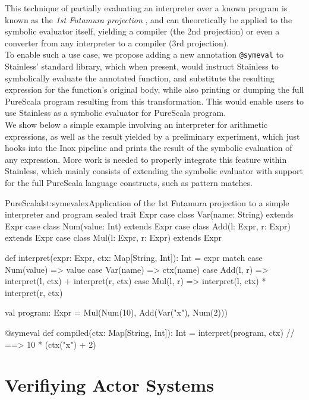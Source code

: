 \documentclass[a4paper,twoside]{article}
\newcommand{\stt}[1]{\texttt{\small{#1}}}
\begin{document}
This technique of partially evaluating an interpreter over a known program is known as the \textit{1st Futamura projection} \cite{futamura}, and can theoretically be applied to the symbolic evaluator itself, yielding a compiler (the 2nd projection) or even a converter from any interpreter to a compiler (3rd projection).\\

To enable such a use case, we propose adding a new annotation \stt{@symeval} to Stainless' standard library, which when present, would instruct Stainless to symbolically evaluate the annotated function, and substitute the resulting expression for the function's original body, while also printing or dumping the full PureScala program resulting from this transformation. This would enable users to use Stainless as a symbolic evaluator for PureScala program.\\

We show below a simple example involving an interpreter for arithmetic expressions, as well as the result yielded by a preliminary experiment, which just hooks into the Inox pipeline and prints the result of the symbolic evaluation of any expression. More work is needed to properly integrate this feature within Stainless, which mainly consists of extending the symbolic evaluator with support for the full PureScala language constructs, such as pattern matches.

\begin{Code}{PureScala}{lst:symevalex}{Application of the 1st Futamura projection to a simple interpreter and program}
sealed trait Expr
case class Var(name: String)     extends Expr
case class Num(value: Int)       extends Expr
case class Add(l: Expr, r: Expr) extends Expr
case class Mul(l: Expr, r: Expr) extends Expr

def interpret(expr: Expr, ctx: Map[String, Int]): Int = expr match {
  case Num(value) => value
  case Var(name)  => ctx(name)
  case Add(l, r)  => interpret(l, ctx) + interpret(r, ctx)
  case Mul(l, r)  => interpret(l, ctx) * interpret(r, ctx)
}

val program: Expr = Mul(Num(10), Add(Var("x"), Num(2)))

@symeval
def compiled(ctx: Map[String, Int]): Int = {
  interpret(program, ctx) // ==> 10 * (ctx("x") + 2)
}
\end{Code}


\clearpage
\section{Verifiying Actor Systems}
\label{actors}
\end{document}
